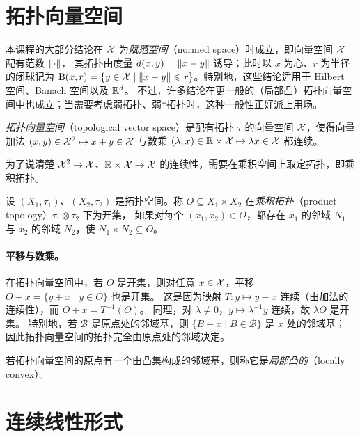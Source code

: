\section{拓扑向量空间}

本课程的大部分结论在 $\mathcal{X}$ 为\emph{赋范空间}（normed space）时成立，即向量空间 $\mathcal{X}$ 配有范数 $\lVert \cdot\rVert$，
其拓扑由度量 $d(x,y)=\lVert x-y\rVert$ 诱导；此时以 $x$ 为心、$r$ 为半径的闭球记为
$\mathrm{B}(x,r)=\{y\in\mathcal{X}\mid\lVert x-y\rVert\leqslant r\}$。特别地，这些结论适用于 Hilbert 空间、Banach 空间以及 $\mathbb{R}^d$。
不过，许多结论在更一般的（局部凸）拓扑向量空间中也成立；当需要考虑弱拓扑、弱*拓扑时，这种一般性正好派上用场。

\begin{definition}[拓扑向量空间]
\label{def:33}
\emph{拓扑向量空间}（topological vector space）是配有拓扑 $\tau$ 的向量空间 $\mathcal{X}$，使得向量加法
$(x,y)\in\mathcal{X}^2\mapsto x+y\in\mathcal{X}$ 与数乘 $(\lambda,x)\in\mathbb{R}\times\mathcal{X}\mapsto\lambda x\in\mathcal{X}$ 都连续。
\end{definition}

为了说清楚 $\mathcal{X}^2\to\mathcal{X}$、$\mathbb{R}\times\mathcal{X}\to\mathcal{X}$ 的连续性，需要在乘积空间上取定拓扑，即乘积拓扑。

\begin{definition}[乘积拓扑]
\label{def:34}
设 $(X_1,\tau_1)$、$(X_2,\tau_2)$ 是拓扑空间。称 $O\subseteq X_1\times X_2$ 在\emph{乘积拓扑}（product topology）$\tau_1\otimes\tau_2$ 下为开集，
如果对每个 $(x_1,x_2)\in O$，都存在 $x_1$ 的邻域 $N_1$ 与 $x_2$ 的邻域 $N_2$，使 $N_1\times N_2\subseteq O$。
\end{definition}

\paragraph{平移与数乘。}
在拓扑向量空间中，若 $O$ 是开集，则对任意 $x\in\mathcal{X}$，平移 $O+x=\{y+x\mid y\in O\}$ 也是开集。
这是因为映射 $T:y\mapsto y-x$ 连续（由加法的连续性），而 $O+x=T^{-1}(O)$。
同理，对 $\lambda\neq0$，$y\mapsto\lambda^{-1}y$ 连续，故 $\lambda O$ 是开集。
特别地，若 $\mathcal{B}$ 是原点处的邻域基，则 $\{B+x\mid B\in\mathcal{B}\}$ 是 $x$ 处的邻域基；
因此拓扑向量空间的拓扑完全由原点处的邻域决定。

\begin{definition}[局部凸拓扑向量空间]
\label{def:35}
若拓扑向量空间的原点有一个由凸集构成的邻域基，则称它是\emph{局部凸的}（locally convex）。
\end{definition}

\section{连续线性形式}

